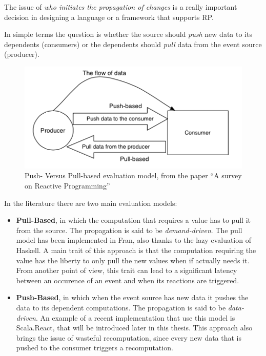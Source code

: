 The issue of \emph{who initiates the propagation of changes} is a really
important decision in designing a language or a framework that supports
RP.

In simple terms the question is whether the source should \emph{push}
new data to its dependents (consumers) or the dependents should
\emph{pull} data from the event source (producer).

\begin{figure}[htbp]
\centering
\includegraphics[scale=0.75]{imgs/eval.png}
\caption{Push- Versus Pull-based evaluation model, from the paper ``A
survey on Reactive Programming''}
\end{figure}

In the literature there are two main evaluation models:

\begin{itemize}
\itemsep1pt\parskip0pt
\item
  \textbf{Pull-Based}, in which the computation that requires a value
  has to pull it from the source. The propagation is said to be
  \emph{demand-driven}. The pull model has been implemented in Fran,
  also thanks to the lazy evaluation of Haskell. A main trait of this
  approach is that the computation requiring the value has the liberty
  to only pull the new values when if actually needs it. From another
  point of view, this trait can lead to a significant latency between an
  occurence of an event and when its reactions are triggered.
\item
  \textbf{Push-Based}, in which when the event source has new data it
  pushes the data to its dependent computations. The propagation is said
  to be \emph{data-driven}. An example of a recent implementation that
  use this model is Scala.React, that will be introduced later in this
  thesis. This approach also brings the issue of wasteful recomputation,
  since every new data that is pushed to the consumer triggers a
  recomputation.
\end{itemize}

